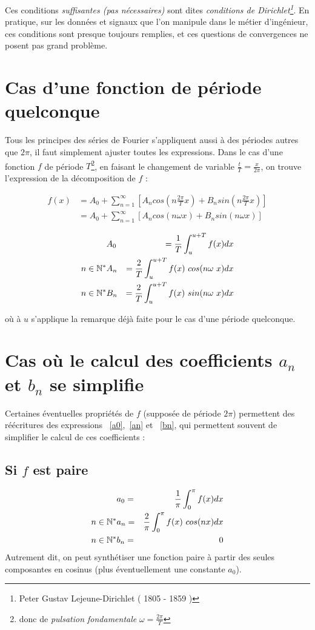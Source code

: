 Ces conditions \emph{suffisantes (pas nécessaires)} sont dites
\emph{conditions de Dirichlet\footnote{Peter Gustav Lejeune-Dirichlet
  ( 1805 - 1859 )}}. En pratique, sur les données et
signaux que l'on manipule dans le métier d'ingénieur, ces conditions
sont presque toujours remplies, et ces questions de convergences ne
posent pas grand problème.


\section{Cas d'une fonction de période quelconque}
Tous les principes des séries de Fourier s'appliquent aussi à des périodes
autres que $2\pi$, il faut simplement ajuster
toutes les expressions. Dans le cas d'une fonction $f$ de période
$T$\footnote{donc de \emph{pulsation fondamentale}
  $\omega=\frac{2\pi}{T}$}, en faisant le changement de variable
$\frac{t}{T}=\frac{x}{2\pi}$, on trouve l'expression de la décomposition de $f$ :

\begin{eqnarray}
f(x) & = A_0+\sum_{n=1}^{\infty}[A_n cos(n\frac{2\pi}{T}x) + B_n sin(n\frac{2\pi}{T}x)] \\
     & = A_0+\sum_{n=1}^{\infty}[A_n cos(n\omega x) + B_n sin(n\omega x)] 
\end{eqnarray}

\begin{eqnarray}
& A_0 & =\frac{1}{T}\int_{u}^{u+T}f(x)dx \label{a0T}\\
n\in \mathbb{N}^* & A_n & =\frac{2}{T}\int_{u}^{u+T}f(x)\ cos(n\omega~x) dx  \label{anT}\\
n\in \mathbb{N}^* & B_n & =\frac{2}{T}\int_{u}^{u+T}f(x)\ sin(n\omega~x) dx  \label{bnT}
\end{eqnarray}

où à $u$ s'applique la remarque déjà faite pour le cas d'une période quelconque.

\section{Cas où le calcul des coefficients $a_n$ et $b_n$ se simplifie}

Certaines éventuelles propriétés de $f$ (supposée de période $2\pi$) 
permettent des réécritures des expressions ~\ref{a0},~\ref{an} et
~\ref{bn}, qui permettent souvent de simplifier le calcul de ces coefficients :
\subsection{Si $f$ est paire}
\begin{eqnarray}
& a_0=&\frac{1}{\pi}\int_{0}^{\pi}f(x)dx \label{a0paire}\\
n\in \mathbb{N}^* & a_n=&\frac{2}{\pi}\int_{0}^{\pi}f(x)\ cos(nx) dx  \label{anpaire}\\
n\in \mathbb{N}^* & b_n=&0  \label{bnpaire}
\end{eqnarray}
Autrement dit, on peut synthétiser une fonction paire à partir des
seules composantes en cosinus (plus éventuellement une constante $a_0$).
